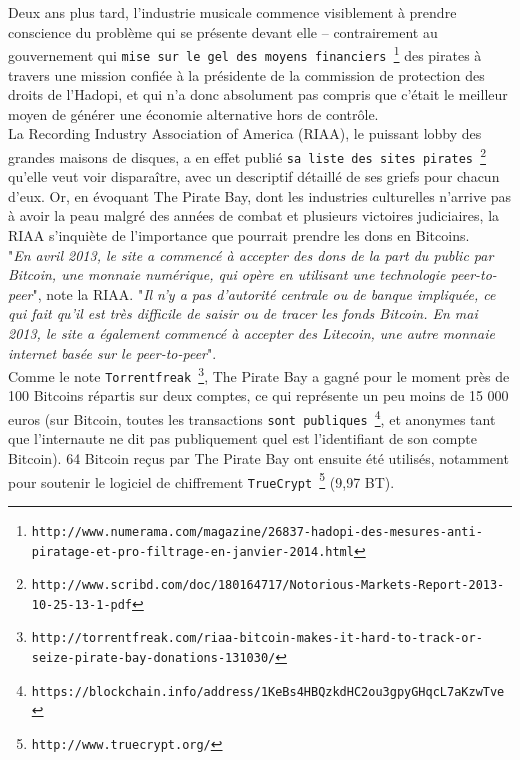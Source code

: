 \documentclass[11pt,twoside,a4paper]{article}
\begin{document}
Deux ans plus tard, l'industrie musicale commence visiblement {\`a} prendre conscience du probl{\`e}me qui se pr{\'e}sente devant elle -- contrairement au gouvernement qui \texttt{mise sur le gel des moyens financiers~\footnote{\texttt{http://www.numerama.com/magazine/26837-hadopi-des-mesures-anti-piratage-et-pro-filtrage-en-janvier-2014.html}}} des pirates {\`a} travers une mission confi{\'e}e {\`a} la pr{\'e}sidente de la commission de protection des droits de l'Hadopi, et qui n'a donc absolument pas compris que c'{\'e}tait le meilleur moyen de g{\'e}n{\'e}rer une {\'e}conomie alternative hors de contr{\^o}le. ~\\

La Recording Industry Association of America (RIAA), le puissant lobby des grandes maisons de disques, a en effet publi{\'e} \texttt{sa liste des sites pirates~\footnote{\texttt{http://www.scribd.com/doc/180164717/Notorious-Markets-Report-2013-10-25-13-1-pdf}}} qu'elle veut voir dispara{\^i}tre, avec un descriptif d{\'e}taill{\'e} de ses griefs pour chacun d'eux. Or, en {\'e}voquant The Pirate Bay, dont les industries culturelles n'arrive pas {\`a} avoir la peau malgr{\'e} des ann{\'e}es de combat et plusieurs victoires judiciaires, la RIAA s'inqui{\`e}te de l'importance que pourrait prendre les dons en Bitcoins. ~\\

"\emph{En avril 2013, le site a commenc{\'e} {\`a} accepter des dons de la part du public par Bitcoin, une monnaie num{\'e}rique, qui op{\`e}re en utilisant une technologie peer-to-peer}", note la RIAA. "\emph{Il n'y a pas d'autorit{\'e} centrale ou de banque impliqu{\'e}e, ce qui fait qu'il est tr{\`e}s difficile de saisir ou de tracer les fonds Bitcoin. En mai 2013, le site a {\'e}galement commenc{\'e} {\`a} accepter des Litecoin, une autre monnaie internet bas{\'e}e sur le peer-to-peer}". ~\\

Comme le note \texttt{Torrentfreak~\footnote{\texttt{http://torrentfreak.com/riaa-bitcoin-makes-it-hard-to-track-or-seize-pirate-bay-donations-131030/}}}, The Pirate Bay a gagn{\'e} pour le moment pr{\`e}s de 100 Bitcoins r{\'e}partis sur deux comptes, ce qui repr{\'e}sente un peu moins de 15 000 euros (sur Bitcoin, toutes les transactions \texttt{sont publiques~\footnote{\texttt{https://blockchain.info/address/1KeBs4HBQzkdHC2ou3gpyGHqcL7aKzwTve}}}, et anonymes tant que l'internaute ne dit pas publiquement quel est l'identifiant de son compte Bitcoin). 64 Bitcoin re\c{c}us par The Pirate Bay ont ensuite {\'e}t{\'e} utilis{\'e}s, notamment pour soutenir le logiciel de chiffrement \texttt{TrueCrypt~\footnote{\texttt{http://www.truecrypt.org/}}} (9,97 BT). ~\\
\end{document}
